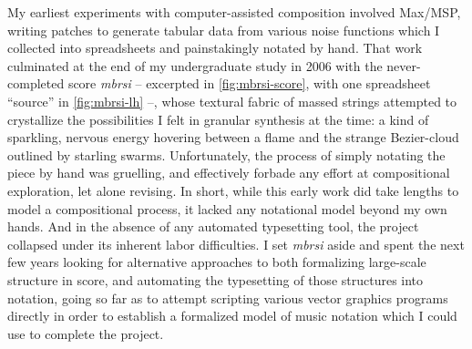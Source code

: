 My earliest experiments with computer-assisted composition involved Max/MSP,
writing patches to generate tabular data from various noise functions which I
collected into spreadsheets and painstakingly notated by hand. That work
culminated at the end of my undergraduate study in 2006 with the
never-completed score \emph{mbrsi} -- excerpted in \autoref{fig:mbrsi-score},
with one spreadsheet \enquote{source} in \autoref{fig:mbrsi-lh} --, whose
textural fabric of massed strings attempted to crystallize the possibilities I
felt in granular synthesis at the time: a kind of sparkling, nervous energy
hovering between a flame and the strange Bezier-cloud outlined by starling
swarms. Unfortunately, the process of simply notating the piece by hand was
gruelling, and effectively forbade any effort at compositional exploration, let
alone revising. In short, while this early work did take lengths to model a
compositional process, it lacked any notational model beyond my own hands. And
in the absence of any automated typesetting tool, the project collapsed under
its inherent labor difficulties. I set \emph{mbrsi} aside and spent the next
few years looking for alternative approaches to both formalizing large-scale
structure in score, and automating the typesetting of those structures into
notation, going so far as to attempt scripting various vector graphics programs
directly in order to establish a formalized model of music notation which
I could use to complete the project.

\begin{figure}[tp]
 \end{figure}

